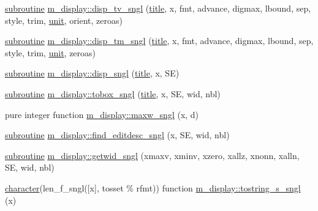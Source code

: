 \begin{DoxyCompactItemize}
\item 
\hyperlink{M__stopwatch_83_8txt_acfbcff50169d691ff02d4a123ed70482}{subroutine} \hyperlink{namespacem__display_ac54e50e6ecc87115c286fe451a4b8a13}{m\+\_\+display\+::disp\+\_\+tv\+\_\+sngl} (\hyperlink{print__watch_83_8txt_a15b5bd21156bb9fca6a755ab8c029a9c}{title}, x, fmt, advance, digmax, lbound, sep, style, trim, \hyperlink{M__stopwatch_83_8txt_a5cbef30eb7c0d734bd82f5a7ebea9aa7}{unit}, orient, zeroas)
\item 
\hyperlink{M__stopwatch_83_8txt_acfbcff50169d691ff02d4a123ed70482}{subroutine} \hyperlink{namespacem__display_ae12795b79f66ff0f9f6843b2f980394a}{m\+\_\+display\+::disp\+\_\+tm\+\_\+sngl} (\hyperlink{print__watch_83_8txt_a15b5bd21156bb9fca6a755ab8c029a9c}{title}, x, fmt, advance, digmax, lbound, sep, style, trim, \hyperlink{M__stopwatch_83_8txt_a5cbef30eb7c0d734bd82f5a7ebea9aa7}{unit}, zeroas)
\item 
\hyperlink{M__stopwatch_83_8txt_acfbcff50169d691ff02d4a123ed70482}{subroutine} \hyperlink{namespacem__display_a1e0883cef47c57b43c8de794fe7724ff}{m\+\_\+display\+::disp\+\_\+sngl} (\hyperlink{print__watch_83_8txt_a15b5bd21156bb9fca6a755ab8c029a9c}{title}, x, SE)
\item 
\hyperlink{M__stopwatch_83_8txt_acfbcff50169d691ff02d4a123ed70482}{subroutine} \hyperlink{namespacem__display_a880ae5ed1f32412fadb1d1b91d406218}{m\+\_\+display\+::tobox\+\_\+sngl} (\hyperlink{print__watch_83_8txt_a15b5bd21156bb9fca6a755ab8c029a9c}{title}, x, SE, wid, nbl)
\item 
pure integer function \hyperlink{namespacem__display_a7d542f36f022c67f2879318796f82e57}{m\+\_\+display\+::maxw\+\_\+sngl} (x, d)
\item 
\hyperlink{M__stopwatch_83_8txt_acfbcff50169d691ff02d4a123ed70482}{subroutine} \hyperlink{namespacem__display_aa41974a4b32f6169cadb3da72991653f}{m\+\_\+display\+::find\+\_\+editdesc\+\_\+sngl} (x, SE, wid, nbl)
\item 
\hyperlink{M__stopwatch_83_8txt_acfbcff50169d691ff02d4a123ed70482}{subroutine} \hyperlink{namespacem__display_a033e94ba8986246bbf567046e8678163}{m\+\_\+display\+::getwid\+\_\+sngl} (xmaxv, xminv, xzero, xallz, xnonn, xalln, SE, wid, nbl)
\item 
\hyperlink{option__stopwatch_83_8txt_abd4b21fbbd175834027b5224bfe97e66}{character}(len\+\_\+f\+\_\+sngl(\mbox{[}x\mbox{]}, tosset \% rfmt)) function \hyperlink{namespacem__display_a05b3cac8d4c04e08dc99c7c23f1254ba}{m\+\_\+display\+::tostring\+\_\+s\+\_\+sngl} (x)
\item 

\end{DoxyCompactItemize}
